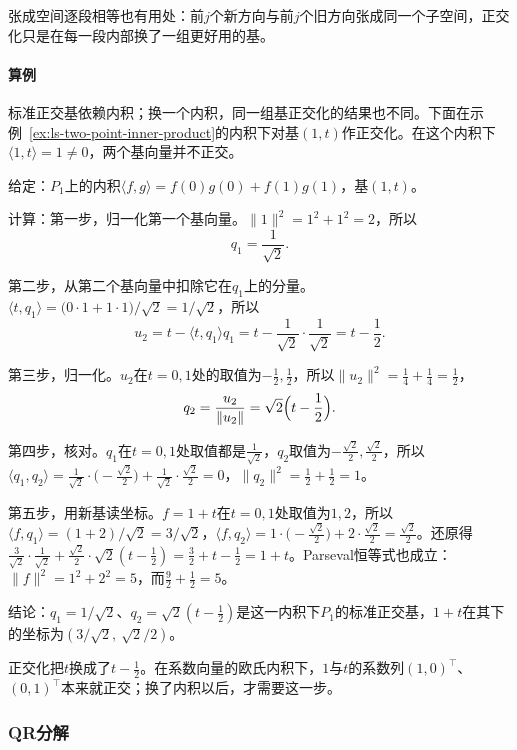 张成空间逐段相等也有用处：前$j$个新方向与前$j$个旧方向张成同一个子空间，正交化只是在每一段内部换了一组更好用的基。

\paragraph{算例}
标准正交基依赖内积；换一个内积，同一组基正交化的结果也不同。下面在示例~\ref{ex:ls-two-point-inner-product}的内积下对基$(1,t)$作正交化。在这个内积下$\langle1,t\rangle=1\neq0$，两个基向量并不正交。
\begin{example}
\label{ex:ls-gram-schmidt-two-point}
给定：$P_1$上的内积$\langle f,g\rangle=f(0)g(0)+f(1)g(1)$，基$(1,t)$。

计算：第一步，归一化第一个基向量。$\lVert1\rVert^2=1^2+1^2=2$，所以
\[
 q_1=\frac1{\sqrt2}.
\]

第二步，从第二个基向量中扣除它在$q_1$上的分量。$\langle t,q_1\rangle=\bigl(0\cdot1+1\cdot1\bigr)/\sqrt2=1/\sqrt2$，所以
\[
 u_2=t-\langle t,q_1\rangle q_1=t-\frac1{\sqrt2}\cdot\frac1{\sqrt2}=t-\frac12.
\]

第三步，归一化。$u_2$在$t=0,1$处的取值为$-\tfrac12,\tfrac12$，所以$\lVert u_2\rVert^2=\tfrac14+\tfrac14=\tfrac12$，
\[
 q_2=\frac{u_2}{\lVert u_2\rVert}=\sqrt2\Bigl(t-\frac12\Bigr).
\]

第四步，核对。$q_1$在$t=0,1$处取值都是$\tfrac1{\sqrt2}$，$q_2$取值为$-\tfrac{\sqrt2}2,\tfrac{\sqrt2}2$，所以$\langle q_1,q_2\rangle=\tfrac1{\sqrt2}\cdot\bigl(-\tfrac{\sqrt2}2\bigr)+\tfrac1{\sqrt2}\cdot\tfrac{\sqrt2}2=0$，$\lVert q_2\rVert^2=\tfrac12+\tfrac12=1$。

第五步，用新基读坐标。$f=1+t$在$t=0,1$处取值为$1,2$，所以$\langle f,q_1\rangle=(1+2)/\sqrt2=3/\sqrt2$，$\langle f,q_2\rangle=1\cdot\bigl(-\tfrac{\sqrt2}2\bigr)+2\cdot\tfrac{\sqrt2}2=\tfrac{\sqrt2}2$。还原得$\tfrac3{\sqrt2}\cdot\tfrac1{\sqrt2}+\tfrac{\sqrt2}2\cdot\sqrt2(t-\tfrac12)=\tfrac32+t-\tfrac12=1+t$。Parseval恒等式也成立：$\lVert f\rVert^2=1^2+2^2=5$，而$\tfrac92+\tfrac12=5$。

结论：$q_1=1/\sqrt2$、$q_2=\sqrt2(t-\tfrac12)$是这一内积下$P_1$的标准正交基，$1+t$在其下的坐标为$(3/\sqrt2,\ \sqrt2/2)$。
\end{example}
正交化把$t$换成了$t-\tfrac12$。在系数向量的欧氏内积下，$1$与$t$的系数列$(1,0)^\top$、$(0,1)^\top$本来就正交；换了内积以后，才需要这一步。

\subsubsection{QR分解}

